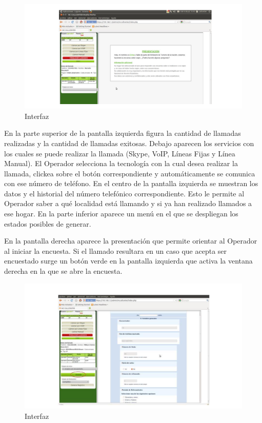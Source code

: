 \documentclass[
  openany]{book}
\begin{document}
\begin{figure}

{\centering \includegraphics[width=1\linewidth]{imagenes/figura6-15} 

}

\caption{Interfaz}\label{fig:Inter}
\end{figure}

En la parte superior de la pantalla izquierda figura la cantidad de llamadas realizadas y la cantidad de llamadas exitosas. Debajo aparecen los servicios con los cuales se puede realizar la llamada (Skype, VoIP, Líneas Fijas y Línea Manual). El Operador selecciona la tecnología con la cual desea realizar la llamada, clickea sobre el botón correspondiente y automáticamente se comunica con ese número de teléfono. En el centro de la pantalla izquierda se muestran los datos y el historial del número telefónico correspondiente. Esto le permite al Operador saber a qué localidad está llamando y si ya han realizado llamados a ese hogar. En la parte inferior aparece un menú en el que se despliegan los estados posibles de generar.

En la pantalla derecha aparece la presentación que permite orientar al Operador al iniciar la encuesta. Si el llamado resultara en un caso que acepta ser encuestado surge un botón verde en la pantalla izquierda que activa la ventana derecha en la que se abre la encuesta.

\begin{figure}

{\centering \includegraphics[width=1\linewidth]{imagenes/figura6-16} 

}

\caption{Interfaz}\label{fig:Int}
\end{figure}
\end{document}

